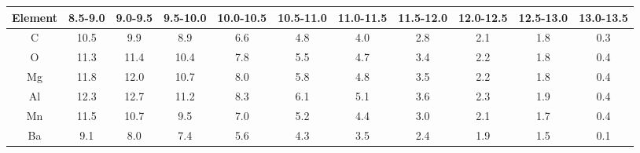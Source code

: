 \begin{tabular}{ccccccccccc}
\hline\hline
Element & 8.5-9.0 & 9.0-9.5 & 9.5-10.0 & 10.0-10.5 & 10.5-11.0 & 11.0-11.5 & 11.5-12.0 & 12.0-12.5 & 12.5-13.0 & 13.0-13.5 \\
\hline
C  & 10.5 & 9.9 & 8.9 & 6.6 & 4.8 & 4.0 & 2.8 & 2.1 & 1.8 & 0.3\\
O  & 11.3 & 11.4 & 10.4 & 7.8 & 5.5 & 4.7 & 3.4 & 2.2 & 1.8 & 0.4\\
Mg  & 11.8 & 12.0 & 10.7 & 8.0 & 5.8 & 4.8 & 3.5 & 2.2 & 1.8 & 0.4\\
Al  & 12.3 & 12.7 & 11.2 & 8.3 & 6.1 & 5.1 & 3.6 & 2.3 & 1.9 & 0.4\\
Mn  & 11.5 & 10.7 & 9.5 & 7.0 & 5.2 & 4.4 & 3.0 & 2.1 & 1.7 & 0.4\\
Ba  & 9.1 & 8.0 & 7.4 & 5.6 & 4.3 & 3.5 & 2.4 & 1.9 & 1.5 & 0.1\\
\hline
\end{tabular}
